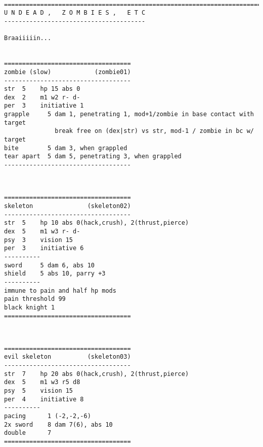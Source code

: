 \








\goodbreak
{}

\goodbreak \begin{samepage} \small \begin{verbatim}
================================================================================
U N D E A D ,   Z O M B I E S ,   E T C
---------------------------------------

Braaiiiiin...


===================================
zombie (slow)            (zombie01)
-----------------------------------
str  5    hp 15 abs 0
dex  2    m1 w2 r- d-
per  3    initiative 1
grapple     5 dam 1, penetrating 1, mod+1/zombie in base contact with target
              break free on (dex|str) vs str, mod-1 / zombie in bc w/ target
bite        5 dam 3, when grappled
tear apart  5 dam 5, penetrating 3, when grappled
-----------------------------------
\end{verbatim} \normalsize \end{samepage}

\

\goodbreak \begin{samepage} \small \begin{verbatim}
===================================
skeleton               (skeleton02)
-----------------------------------
str  5    hp 10 abs 0(hack,crush), 2(thrust,pierce)
dex  5    m1 w3 r- d-
psy  3    vision 15
per  3    initiative 6
----------
sword     5 dam 6, abs 10
shield    5 abs 10, parry +3
----------
immune to pain and half hp mods
pain threshold 99
black knight 1
===================================
\end{verbatim} \normalsize \end{samepage}

\

\goodbreak \begin{samepage} \small \begin{verbatim}
===================================
evil skeleton          (skeleton03)
-----------------------------------
str  7    hp 20 abs 0(hack,crush), 2(thrust,pierce)
dex  5    m1 w3 r5 d8
psy  5    vision 15
per  4    initiative 8
----------
pacing      1 (-2,-2,-6)
2x sword    8 dam 7(6), abs 10
double      7
===================================
\end{verbatim} \normalsize \end{samepage}

